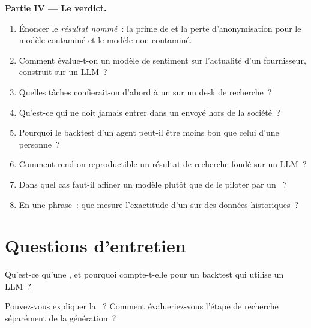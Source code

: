 \begin{problem}
\medskip\noindent\textbf{Partie IV --- Le verdict.}
\begin{enumerate}[resume]
\item Énoncer le \emph{résultat nommé}~: la prime de  et la perte d'anonymisation pour le modèle contaminé et le
modèle non contaminé.
\item Comment évalue-t-on un modèle de sentiment sur l'actualité d'un fournisseur, construit sur un LLM~?
\item Quelles tâches confierait-on d'abord à un  sur un desk de recherche~?
\item Qu'est-ce qui ne doit jamais entrer dans un  envoyé hors de la société~?
\item Pourquoi le backtest d'un agent peut-il être moins bon que celui d'une personne~?
\item Comment rend-on reproductible un résultat de recherche fondé sur un LLM~?
\item Dans quel cas faut-il affiner un modèle plutôt que de le piloter par un ~?
\item En une phrase~: que mesure l'exactitude d'un  sur des données historiques~?
\end{enumerate}
\end{problem}

\section{Questions d'entretien}

\begin{interviewq}\label{iq:ml:large-language-models-in-finance:1}
Qu'est-ce qu'une , et pourquoi compte-t-elle pour un backtest qui utilise un LLM~?
\end{interviewq}

\begin{interviewq}\label{iq:ml:large-language-models-in-finance:2}
Pouvez-vous expliquer la ~? Comment évalueriez-vous l'étape de recherche séparément de la génération~?
\end{interviewq}

